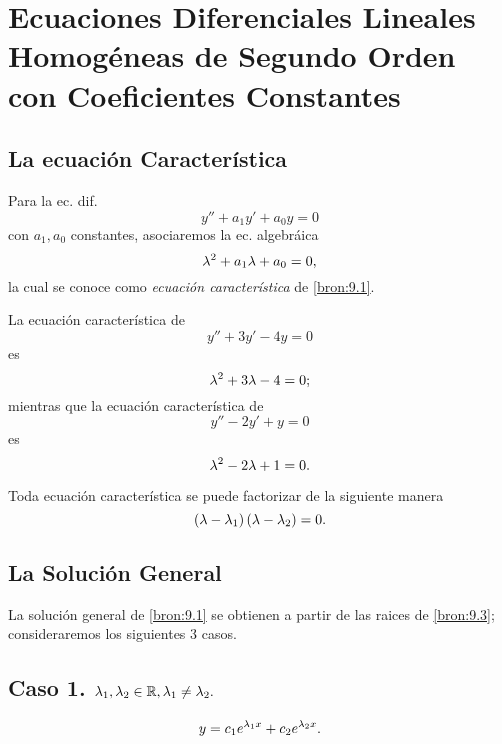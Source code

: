 \section{Ecuaciones Diferenciales Lineales Homog\'eneas de Segundo Orden con Coeficientes Constantes}

\subsection{La ecuaci\'on Caracter\'istica}


Para la ec. dif.
\begin{equation}
	\label{bron:9.1}
	y''+a_{1}y'+a_{0}y=0
\end{equation}
con $a_{1},a_{0}$ constantes, asociaremos la ec. algebráica
\begin{equation}
	\label{bron:9.2}
	\lambda^{2}+a_{1}\lambda+a_{0}=0,
\end{equation}
la cual se conoce como \emph{ecuaci\'on caracter\'istica} de \eqref{bron:9.1}.



\begin{problema}
	La ecuaci\'on caracter\'istica de $$y''+3y'-4y=0$$ es  $$\lambda^{2}+3\lambda-4=0;$$  mientras que la ecuaci\'on caracter\'istica de $$y''-2y'+y=0$$ es  $$\lambda^{2}-2\lambda+1=0.$$
\end{problema}




Toda ecuaci\'on caracter\'istica se puede factorizar de la siguiente manera
\begin{equation}
	\label{bron:9.3}
	\left( \lambda- \lambda_{1} \right)\left( \lambda-\lambda_{2} \right)=0.
\end{equation}



\subsection{La Soluci\'on General}


La soluci\'on general de \eqref{bron:9.1} se obtienen a partir de las raices de \eqref{bron:9.3}; consideraremos los siguientes 3 casos.




\subsection{Caso 1. $\lambda_{1}, \lambda_{2}\in \mathbb{R}, \lambda_{1}\neq \lambda_{2}.$ }

\begin{equation}
	\label{bron:9.4}
	y=c_{1}e^{\lambda_{1}x}+c_{2}e^{\lambda_{2}x}.
\end{equation}

